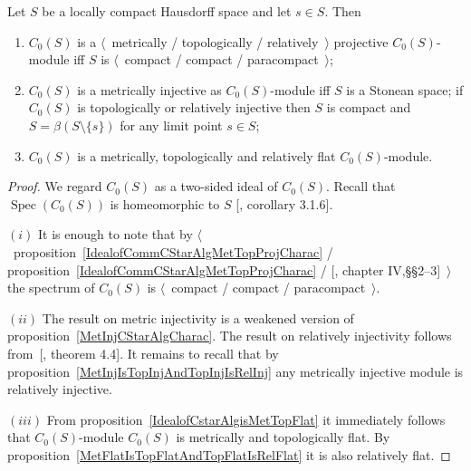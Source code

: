 \begin{proposition}\label{C0SC0SModMetTopRelProjInjFlat} Let $S$ be a locally
compact Hausdorff space and let $s\in S$. Then

\begin{enumerate}[label = (\roman*)]
    \item $C_0(S)$ is a $\langle$~metrically / 
    topologically / relatively~$\rangle$
    projective $C_0(S)$-module iff $S$ is $\langle$~compact / compact /
    paracompact~$\rangle$;

    \item $C_0(S)$ is a metrically injective as $C_0(S)$-module iff $S$ is 
    a Stonean space; if $C_0(S)$ is topologically or relatively injective then
    $S$ is compact and $S=\beta(S\setminus \{ s\})$ for any limit point $s\in S$;

    \item $C_0(S)$ is a metrically, topologically and relatively flat 
    $C_0(S)$-module.
\end{enumerate}
\end{proposition}
\begin{proof} We regard $C_0(S)$ as a two-sided ideal of $C_0(S)$. Recall that
$\operatorname{Spec}(C_0(S))$ is homeomorphic to $S$ [\cite{HelHomolBanTopAlg},
corollary 3.1.6].

$(i)$ It is enough to note that by
$\langle$~proposition~\ref{IdealofCommCStarAlgMetTopProjCharac} /
proposition~\ref{IdealofCommCStarAlgMetTopProjCharac} /
[\cite{HelHomolBanTopAlg}, chapter IV,\S\S 2--3]~$\rangle$ the spectrum of
$C_0(S)$ is $\langle$~compact / compact / paracompact~$\rangle$. 

$(ii)$ The result on metric injectivity is a weakened version of
proposition~\ref{MetInjCStarAlgCharac}. The result on relatively injectivity 
follows from~[\cite{NemANoteOnRelInjC0ModC0}, theorem 4.4]. It remains to recall
that by proposition~\ref{MetInjIsTopInjAndTopInjIsRelInj} any metrically injective
module is relatively injective.

$(iii)$ From proposition~\ref{IdealofCstarAlgisMetTopFlat} it immediately follows
that $C_0(S)$-module $C_0(S)$ is metrically and topologically flat. By
proposition~\ref{MetFlatIsTopFlatAndTopFlatIsRelFlat} it is also relatively
flat.
\end{proof}

